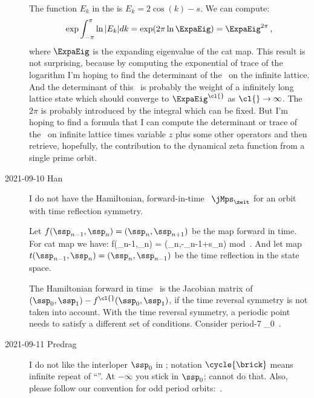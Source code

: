 \begin{description}
The function $E_k$ in the  is $E_k = 2\cos(k)-s$.
We can compute:
\[
\exp \int_{-\pi}^{\pi} \ln |E_k| dk = \exp (2\pi \ln \ExpaEig) = \ExpaEig^{2\pi} \,,
\]
where $\ExpaEig$ is the expanding eigenvalue of the cat map. This result is not
surprising, because by computing the exponential of trace of the logarithm I'm
hoping to find the determinant of the \jacobianOrb\ on the infinite lattice. And the
determinant of this \jacobianOrb\ is probably the weight of a infinitely long lattice
state which should converge to $\ExpaEig^\cl{}$ as $\cl{} \to \infty$. The $2\pi$ is
probably introduced by the integral which can be fixed. But I'm hoping to find a formula
that I can compute the determinant or trace of the \jacobianOrb\ on infinite lattice times
variable $z$ plus some other operators and then retrieve, 	hopefully, the contribution
to the dynamical zeta function from a single prime orbit.

\item[2021-09-10 Han]
I do not have the Hamiltonian, forward-in-time \jacobianM\ ${\jMps}_\zeit$ for
an orbit with time reflection symmetry.

Let $f(\ssp_{n-1},\ssp_{n}) = (\ssp_{n},\ssp_{n+1})$ be the map forward in time.
For cat map we have:
\bea
f(\ssp_{n-1},\ssp_{n}) = (\ssp_{n},-\ssp_{n-1}+s\ssp_{n}) \quad \mbox{mod}
\,.
\eea
And let map $t(\ssp_{n-1},\ssp_{n}) = (\ssp_{n},\ssp_{n-1})$ be the time reflection
in the state space.

The Hamiltonian forward in time \jacobianOrb\ is the Jacobian matrix of
$(\ssp_0,\ssp_1)-f^\cl{}(\ssp_0,\ssp_1)$,
if the time reversal symmetry is not taken into account.
With the time reversal symmetry, a periodic point needs to satisfy a different set of conditions.
Consider period-7 {\lattstate}
\beq
\ssp_0 
\,.

\item[2021-09-11 Predrag]
I do not like the interloper $\ssp_0$ in ; notation
$\cycle{\mbox{\brick}}$ means infinite repeat of ``\brick''.
At $-\infty$ you stick in $\ssp_0$; cannot do that.
Also, please follow our convention  for odd period
orbits:
\beq
\,.


\end{description}
